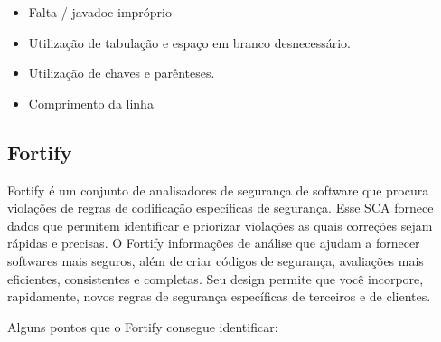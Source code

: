 \documentclass[12pt]{article}
\begin{document}
\begin{itemize}
 \item Falta / javadoc impróprio
 \item Utilização de tabulação e espaço em branco desnecessário.
 \item Utilização de chaves e parênteses.
 \item Comprimento da linha
\end{itemize}

\subsection{Fortify} \label{sec:fortify}
Fortify\cite{FORTIFY} é um conjunto de analisadores de segurança de software que procura violações de regras de codificação específicas de segurança. Esse SCA fornece dados que permitem identificar e priorizar violações as quais correções sejam rápidas e precisas.
O Fortify informações de análise que ajudam a fornecer softwares mais seguros, além de criar códigos de segurança, avaliações mais eficientes, consistentes e completas. Seu design permite que você incorpore, rapidamente, novos regras de segurança específicas de terceiros e de clientes.

Alguns pontos que o Fortify consegue identificar\cite{OWASP}:
\end{document}
